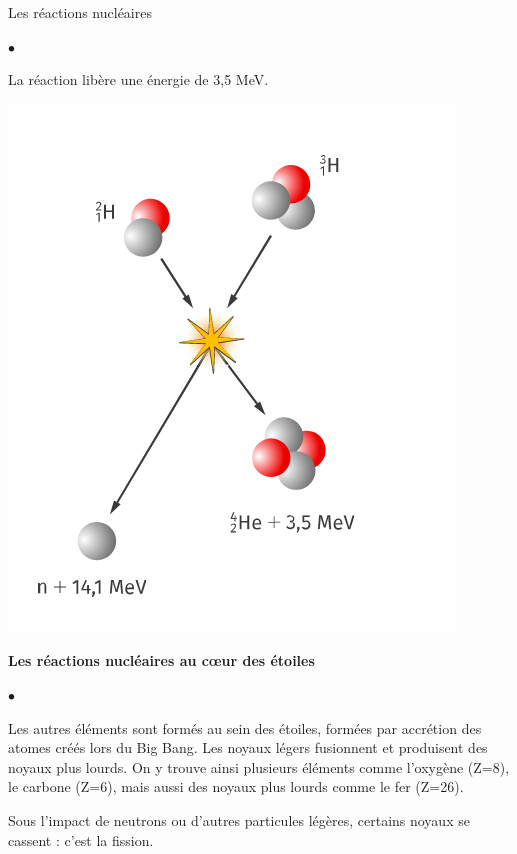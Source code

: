 \documentclass[24pt]{article}
\begin{document}
\begin{concept}{Les réactions nucléaires}
\begin{list}{$\bullet$}{}
\begin{minipage}[c]{0.6\textwidth}
                  La réaction libère une énergie de 3,5 MeV.
              \end{minipage}
              \hspace{0.05\textwidth}
              \begin{minipage}[c]{0.3\textwidth}
                  \begin{center}
                      \includegraphics[width=0.8\columnwidth]{nuclear1.png}
                  \end{center}
              \end{minipage}
    \end{list}

    \begin{center}
        \textbf{Les réactions nucléaires au cœur des étoiles}
    \end{center}

    \begin{list}{$\bullet$}{}
        \item Les autres éléments sont formés au sein des étoiles, formées par accrétion des
              atomes créés lors du Big Bang.
              Les noyaux légers fusionnent et produisent des noyaux plus lourds.
              On y trouve ainsi plusieurs éléments comme l’oxygène (Z=8), le carbone (Z=6),
              mais aussi des noyaux plus lourds comme le fer (Z=26).

        \item Sous l’impact de neutrons ou d’autres particules légères, certains noyaux se
              cassent : c’est la fission.


\end{list}
\end{concept}
\end{document}
